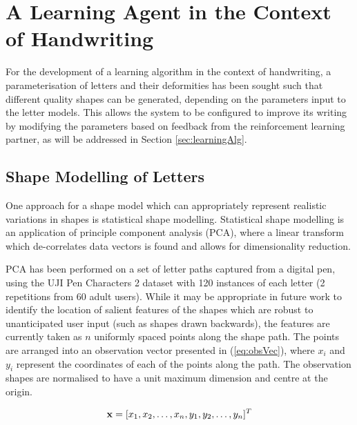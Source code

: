 \documentclass{sig-alternate}
\begin{document}
\section{A Learning Agent in the Context of Handwriting} \label{sec:learningAlgorithm}

For the development of a learning algorithm in the context of
handwriting, a parameterisation of letters and their deformities has been sought such 
that different quality shapes can be generated, depending on the parameters input to
the letter models. This allows the system to be configured to improve its writing 
by modifying the parameters based on feedback from the 
reinforcement learning partner, as will be addressed in Section \ref{sec:learningAlg}. 

\subsection{Shape Modelling of Letters} \label{sec:writingGeneration}

One approach for a shape model which can appropriately represent realistic
variations in shapes is statistical shape
modelling. Statistical shape modelling is an application of principle component
analysis (PCA), where a linear transform which de-correlates data vectors is
found \cite{Stegmann2002} and allows for dimensionality reduction. 

PCA has been performed on a set of letter paths captured from a digital pen,
using the UJI Pen Characters 2 dataset \cite{Llorens2008} with 120 instances of
each letter (2 repetitions from 60 adult users). While it may be appropriate in future work to
identify the location of salient features of the shapes which are robust to 
unanticipated user input (such as shapes drawn backwards),
the features are currently taken as $n$ uniformly spaced points along the shape
path. The
points are arranged into an observation vector presented in (\ref{eq:obsVec}),
where $x_i$ and $y_i$ represent the coordinates of each of the points along the
path. The observation shapes are normalised to have a unit maximum dimension 
and centre at the origin.

\begin{equation}\label{eq:obsVec}
{\bf x} = [x_1, x_2, \ldots, x_n, y_1, y_2, \ldots, y_n]^T
\end{equation}
\end{document}
